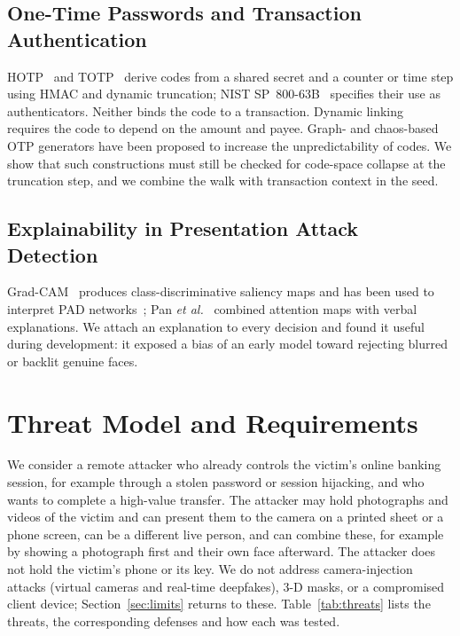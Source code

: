 \documentclass{ieeeaccess}
\begin{document}
\subsection{One-Time Passwords and Transaction Authentication}
HOTP~\cite{rfc4226} and TOTP~\cite{rfc6238} derive codes from a shared secret and a counter or time step
using HMAC and dynamic truncation; NIST SP~800-63B~\cite{nist80063b} specifies their use as
authenticators. Neither binds the code to a transaction. Dynamic linking~\cite{psd2rts} requires the
code to depend on the amount and payee. Graph- and chaos-based OTP generators have been proposed to
increase the unpredictability of codes.  %
We show that such constructions must still be checked for code-space collapse at the truncation step,
and we combine the walk with transaction context in the seed.

\subsection{Explainability in Presentation Attack Detection}
Grad-CAM~\cite{gradcam} produces class-discriminative saliency maps and has been used to interpret
PAD networks~\cite{sequeira2021}; Pan \emph{et al.}~\cite{pan2022} combined attention maps with verbal
explanations. We attach an explanation to every decision and found it useful during development: it
exposed a bias of an early model toward rejecting blurred or backlit genuine faces.


\section{Threat Model and Requirements}
\label{sec:threat}
We consider a remote attacker who already controls the victim's online banking session, for example
through a stolen password or session hijacking, and who wants to complete a high-value transfer. The
attacker may hold photographs and videos of the victim and can present them to the camera on a printed
sheet or a phone screen, can be a different live person, and can combine these, for example by showing
a photograph first and their own face afterward. The attacker does not hold the victim's phone or its
key. We do not address camera-injection attacks (virtual cameras and real-time deepfakes), 3-D masks,
or a compromised client device; Section~\ref{sec:limits} returns to these. Table~\ref{tab:threats}
lists the threats, the corresponding defenses and how each was tested.
\end{document}
